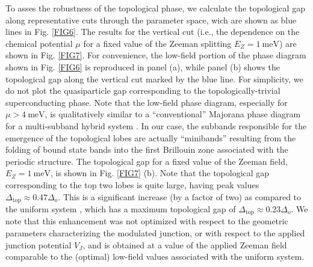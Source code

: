 \documentclass[twocolumn,aps,prb,nofootinbib]{revtex4-2}
\begin{document}
To asses the robustness of the topological phase, we calculate the topological gap along representative cuts through the parameter space, wich are shown as blue lines in Fig. \ref{FIG6}. The results for the vertical cut (i.e., the dependence on the chemical potential $\mu$ for a  fixed value of the Zeeman splitting $E_Z = 1~\text{meV}$) are shown in Fig. \ref{FIG7}. For convenience, the low-field portion of the phase diagram shown in  Fig. \ref{FIG6} is reproduced in panel (a), while panel (b) shows the topological gap along the vertical cut marked by the blue line. For simplicity, we do not plot the quasiparticle gap corresponding to the topologically-trivial superconducting phase.
Note that the low-field  phase diagram, especially for $\mu > 4~\text{meV}$, is qualitatively similar to  a ``conventional'' Majorana phase diagram for a multi-subband hybrid system \cite{Stanescu2013}. In our case, the subbands responsible for the emergence of the topological lobes  are actually ``minibands'' resulting from  the folding of bound state bands into the first Brillouin zone associated with the periodic structure. 
The topological gap  for a  fixed  value of the Zeeman field, $E_Z = 1~\text{meV}$, is shown in Fig. \ref{FIG7} (b). Note that  the topological gap corresponding to  the top two lobes is quite large, having peak values  $\Delta_{\text{top}} \approx 0.47 \Delta_o$. This is a significant increase  (by a factor of two) as compared to the uniform system , which has a maximum topological gap of $\Delta_{\text{top}} \approx 0.23 \Delta_o$. We note that this enhancement was not optimized with respect to the geometric parameters characterizing the modulated junction, or with respect to the applied junction potential $V_J$, and is obtained at a value of the applied Zeeman field comparable to the (optimal) low-field values associated with the uniform system. 
\end{document}
